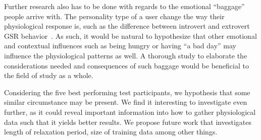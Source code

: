 Further research also has to be done with regards to the emotional ``baggage'' people arrive with. 
The personality type of a user change the way their physiological response is, such as the difference between introvert and extrovert GSR behavior~\cite{Foglia20081814}.
As such, it would be natural to hypothesize that other emotional and contextual influences such as being hungry or having ``a bad day'' may influence the physiological patterns as well. 
A thorough study to elaborate the considerations needed and consequences of such baggage would be beneficial to the field of study as a whole. 

Considering the five best performing test participants, we hypothesis that some similar circumstance may be present. We
find it interesting to investigate even further, as it could reveal important information into how to gather physiological data such
that it yields better results. We propose future work that investigates length of relaxation period, size of training
data among other things.
